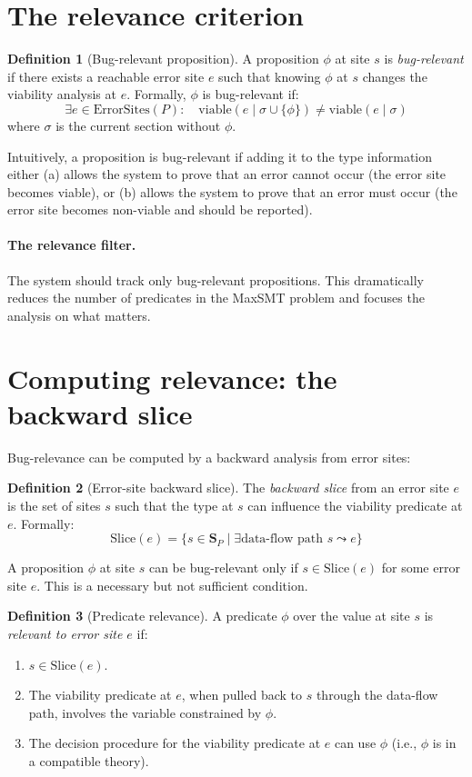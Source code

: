 \documentclass[11pt]{report}
\theoremstyle{definition}
\newtheorem{definition}{Definition}[section]
\theoremstyle{plain}
\begin{document}
\section{The relevance criterion}

\begin{definition}[Bug-relevant proposition]
A proposition $\phi$ at site $s$ is \emph{bug-relevant} if there exists a
reachable error site $e$ such that knowing $\phi$ at $s$ changes the
viability analysis at $e$. Formally, $\phi$ is bug-relevant if:
\[
  \exists e \in \mathrm{ErrorSites}(P) : \quad
  \mathrm{viable}(e \mid \sigma \cup \{\phi\}) \neq
  \mathrm{viable}(e \mid \sigma)
\]
where $\sigma$ is the current section without $\phi$.
\end{definition}

Intuitively, a proposition is bug-relevant if adding it to the type
information either (a) allows the system to prove that an error cannot occur
(the error site becomes viable), or (b) allows the system to prove that an
error must occur (the error site becomes non-viable and should be reported).

\paragraph{The relevance filter.}
The system should track only bug-relevant propositions. This dramatically
reduces the number of predicates in the MaxSMT problem and focuses the
analysis on what matters.

\section{Computing relevance: the backward slice}

Bug-relevance can be computed by a backward analysis from error sites:

\begin{definition}[Error-site backward slice]
The \emph{backward slice} from an error site $e$ is the set of sites
$s$ such that the type at $s$ can influence the viability predicate at $e$.
Formally:
\[
  \mathrm{Slice}(e) = \{s \in \mathbf{S}_P \mid
    \exists \text{data-flow path } s \leadsto e\}
\]
\end{definition}

A proposition $\phi$ at site $s$ can be bug-relevant only if $s \in
\mathrm{Slice}(e)$ for some error site $e$. This is a necessary but not
sufficient condition.

\begin{definition}[Predicate relevance]
A predicate $\phi$ over the value at site $s$ is \emph{relevant to error
site $e$} if:
\begin{enumerate}[nosep]
  \item $s \in \mathrm{Slice}(e)$.
  \item The viability predicate at $e$, when pulled back to $s$ through the
        data-flow path, involves the variable constrained by $\phi$.
  \item The decision procedure for the viability predicate at $e$ can use
        $\phi$ (i.e., $\phi$ is in a compatible theory).
\end{enumerate}
\end{definition}
\end{document}
